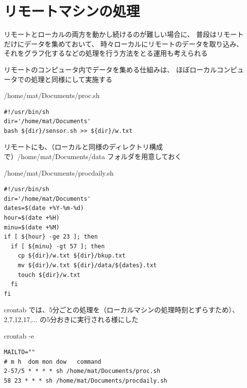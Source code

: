 \documentclass[12pt,a4j]{jsbook}
\begin{document}
\section{リモートマシンの処理}

リモートとローカルの両方を動かし続けるのが難しい場合に、
普段はリモートだけにデータを集めておいて、
時々ローカルにリモートのデータを取り込み、
それをグラフ化するなどの処理を行う方法をとる運用も考えられる


リモートのコンピュータ内でデータを集める仕組みは、
ほぼローカルコンピュータでの処理と同様にして実施する

\begin{spacing}{0.95}
\begin{itembox}[l]{/home/mat/Documents/proc.sh}
\begin{verbatim}
#!/usr/bin/sh
dir='/home/mat/Documents'
bash ${dir}/sensor.sh >> ${dir}/w.txt
\end{verbatim}
\end{itembox}
\end{spacing}

リモートにも、（ローカルと同様のディレクトリ構成で）/home/mat/Documents/data フォルダを用意しておく

\begin{spacing}{0.95}
\begin{itembox}[l]{/home/mat/Documents/procdaily.sh}
\begin{verbatim}
#!/usr/bin/sh
dir='/home/mat/Documents'
dates=$(date +%Y-%m-%d)
hour=$(date +%H)
minu=$(date +%M)
if [ ${hour} -ge 23 ]; then
  if [ ${minu} -gt 57 ]; then
    cp ${dir}/w.txt ${dir}/bkup.txt
    mv ${dir}/w.txt ${dir}/data/${dates}.txt
    touch ${dir}/w.txt
  fi
fi
\end{verbatim}
\end{itembox}
\end{spacing}

crontab では、5分ごとの処理を（ローカルマシンの処理時刻とずらすため）、2,7,12,17,... の5分おきに実行される様にした

\begin{spacing}{0.95}
\begin{itembox}[l]{crontab -e}
\begin{verbatim}
MAILTO=""
# m h  dom mon dow   command
2-57/5 * * * * sh /home/mat/Documents/proc.sh
58 23 * * * sh /home/mat/Documents/procdaily.sh
\end{verbatim}
\end{itembox}
\end{spacing}
\end{document}

